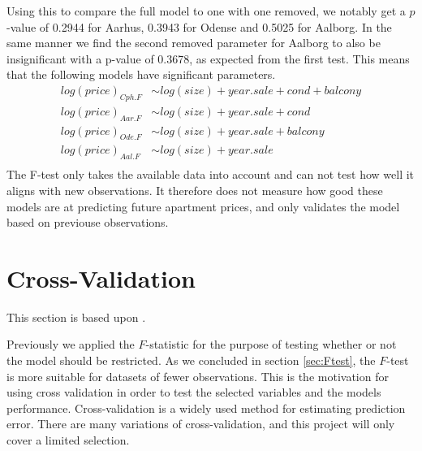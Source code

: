 Using this to compare the full model to one with one removed, we notably get a $p$-value of 0.2944 for Aarhus, 0.3943 for Odense and 0.5025 for Aalborg. 
In the same manner we find the second removed parameter for Aalborg to also be insignificant with a p-value of 0.3678, as expected from the first test.
This means that the following models have significant parameters.
\begin{align*}
    log(price)_{Cph.F} &\sim log(size) + year.sale + cond + balcony \\
    log(price)_{Aar.F} &\sim log(size) + year.sale + cond \\
    log(price)_{Ode.F} &\sim log(size) + year.sale + balcony \\
    log(price)_{Aal.F} &\sim log(size) + year.sale \\
\end{align*}
The F-test only takes the available data into account and can not test how well it aligns with new observations.
It therefore does not measure how good these models are at predicting future apartment prices, and only validates the model based on previouse observations. 



    
    
    

\section{Cross-Validation} \label{sec:CV}
This section is based upon \cite{Hastie2008}.

Previously we applied the $F$-statistic for the purpose of testing whether or not the model should be restricted. 
As we concluded in section \ref{sec:Ftest}, the $F$-test is more suitable for datasets of fewer observations. 
This is the motivation for using cross validation in order to test the selected variables and the models performance.
Cross-validation is a widely used method for estimating prediction error.
There are many variations of cross-validation, and this project will only cover a limited selection. 

